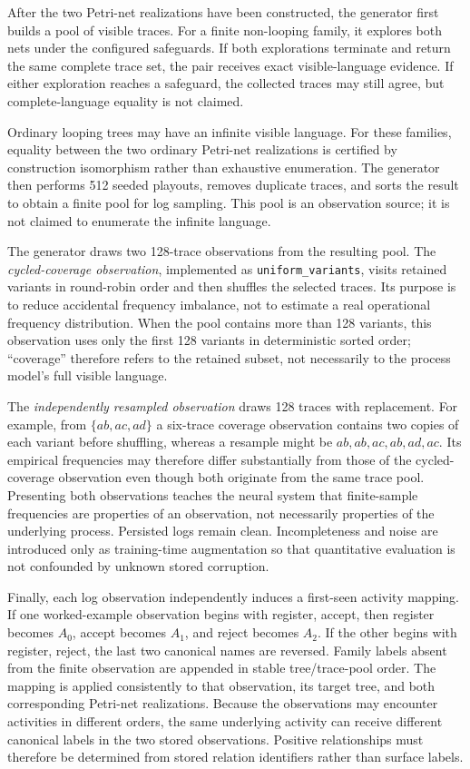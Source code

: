 \documentclass[pdflatex,sn-basic]{sn-jnl}
\begin{document}
After the two Petri-net realizations have been constructed, the generator first builds a pool of visible traces. For a finite non-looping family, it explores both nets under the configured safeguards. If both explorations terminate and return the same complete trace set, the pair receives exact visible-language evidence. If either exploration reaches a safeguard, the collected traces may still agree, but complete-language equality is not claimed.

Ordinary looping trees may have an infinite visible language. For these families, equality between the two ordinary Petri-net realizations is certified by construction isomorphism rather than exhaustive enumeration. The generator then performs 512 seeded playouts, removes duplicate traces, and sorts the result to obtain a finite pool for log sampling. This pool is an observation source; it is not claimed to enumerate the infinite language.

The generator draws two 128-trace observations from the resulting pool. The \emph{cycled-coverage observation}, implemented as \texttt{uniform\_variants}, visits retained variants in round-robin order and then shuffles the selected traces. Its purpose is to reduce accidental frequency imbalance, not to estimate a real operational frequency distribution. When the pool contains more than 128 variants, this observation uses only the first 128 variants in deterministic sorted order; ``coverage'' therefore refers to the retained subset, not necessarily to the process model's full visible language.

The \emph{independently resampled observation} draws 128 traces with replacement. For example, from $\{ab,ac,ad\}$ a six-trace coverage observation contains two copies of each variant before shuffling, whereas a resample might be $ab,ab,ac,ab,ad,ac$. Its empirical frequencies may therefore differ substantially from those of the cycled-coverage observation even though both originate from the same trace pool. Presenting both observations teaches the neural system that finite-sample frequencies are properties of an observation, not necessarily properties of the underlying process. Persisted logs remain clean. Incompleteness and noise are introduced only as training-time augmentation so that quantitative evaluation is not confounded by unknown stored corruption.

Finally, each log observation independently induces a first-seen activity mapping. If one worked-example observation begins with \textsf{register}, \textsf{accept}, then \textsf{register} becomes $A_0$, \textsf{accept} becomes $A_1$, and \textsf{reject} becomes $A_2$. If the other begins with \textsf{register}, \textsf{reject}, the last two canonical names are reversed. Family labels absent from the finite observation are appended in stable tree/trace-pool order. The mapping is applied consistently to that observation, its target tree, and both corresponding Petri-net realizations. Because the observations may encounter activities in different orders, the same underlying activity can receive different canonical labels in the two stored observations. Positive relationships must therefore be determined from stored relation identifiers rather than surface labels.
\end{document}
